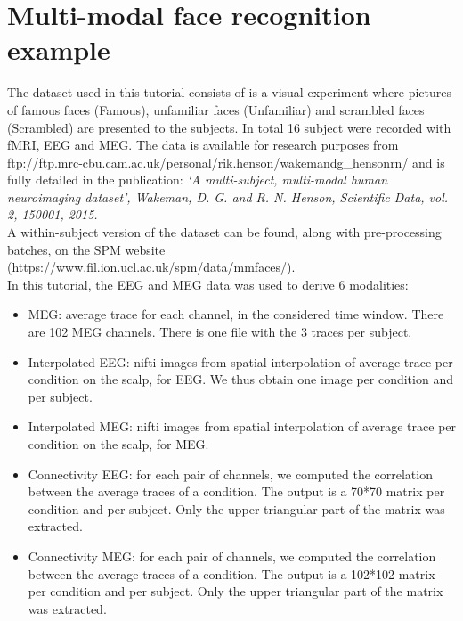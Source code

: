 
\chapter{Multi-modal face recognition example}
\label{sec:multimodal_face}
\minitoc

The dataset used in this tutorial consists of is a visual experiment where pictures of famous faces (Famous), unfamiliar faces (Unfamiliar) and scrambled faces (Scrambled) are presented to the subjects. In total 16 subject were recorded with fMRI, EEG and MEG. The data is available for research purposes from ftp://ftp.mrc-cbu.cam.ac.uk/personal/rik.henson/wakemandg\_hensonrn/ and is fully detailed in the publication: \textit{‘A multi-subject, multi-modal human neuroimaging dataset’, Wakeman, D. G. and R. N. Henson, Scientific Data, vol. 2, 150001, 2015.}
\\

A within-subject version of the dataset can be found, along with pre-processing batches, on the SPM website (https://www.fil.ion.ucl.ac.uk/spm/data/mmfaces/).
\\

In this tutorial, the EEG and MEG data was used to derive 6 modalities:

\begin{itemize}

\item MEG: average trace for each channel, in the considered time window. There are 102 MEG channels. There is one file with the 3 traces per subject.
\item Interpolated EEG: nifti images from spatial interpolation of average trace per condition on the scalp, for EEG. We thus obtain one image per condition and per subject.
\item Interpolated MEG: nifti images from spatial interpolation of average trace per condition on the scalp, for MEG.
\item Connectivity EEG: for each pair of channels, we computed the correlation between the average traces of a condition. The output is a 70*70 matrix per condition and per subject. Only the upper triangular part of the matrix was extracted.
\item Connectivity MEG: for each pair of channels, we computed the correlation between the average traces of a condition. The output is a 102*102 matrix per condition and per subject. Only the upper triangular part of the matrix was extracted.
\end{itemize}

